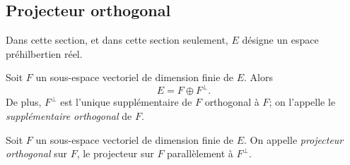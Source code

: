 \documentclass{magnolia}
\begin{document}

\subsection{Projecteur orthogonal}

Dans cette section, et dans cette section seulement, $E$ désigne un espace préhilbertien réel.\\

\begin{definition}
Soit $F$ un sous-espace vectoriel de dimension finie de $E$. Alors
\[E=F\oplus F^\perp.\]
De plus, $F^\perp$ est l'unique supplémentaire de $F$ orthogonal à $F$; on l'appelle le \emph{supplémentaire orthogonal}
de $F$.
\end{definition}


\begin{definition}[utile=-3]
Soit $F$ un sous-espace vectoriel de dimension finie de $E$. On appelle \emph{projecteur orthogonal} sur
$F$, le projecteur sur $F$ parallèlement à $F^\perp$.
\end{definition}
\end{document}
